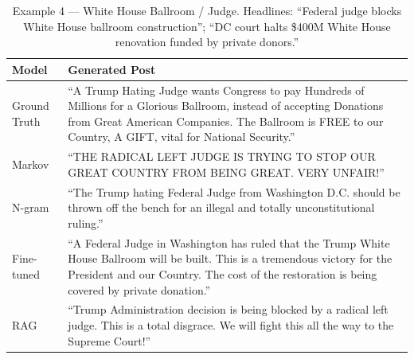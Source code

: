 \documentclass[11pt,a4paper]{article}
\begin{document}
\begin{table}[H]
\centering
\caption{Example 4 --- White House Ballroom / Judge. Headlines: ``Federal judge blocks White House ballroom construction''; ``DC court halts \$400M White House renovation funded by private donors.''}
\label{tab:qual4}
\begin{tabular}{lp{9.5cm}}
\toprule
\textbf{Model} & \textbf{Generated Post} \\
\midrule
Ground Truth  & ``A Trump Hating Judge wants Congress to pay Hundreds of Millions for a Glorious Ballroom, instead of accepting Donations from Great American Companies. The Ballroom is FREE to our Country, A GIFT, vital for National Security.'' \\
\midrule
Markov        & ``THE RADICAL LEFT JUDGE IS TRYING TO STOP OUR GREAT COUNTRY FROM BEING GREAT. VERY UNFAIR!'' \\
N-gram        & ``The Trump hating Federal Judge from Washington D.C. should be thrown off the bench for an illegal and totally unconstitutional ruling.'' \\
Fine-tuned    & ``A Federal Judge in Washington has ruled that the Trump White House Ballroom will be built. This is a tremendous victory for the President and our Country. The cost of the restoration is being covered by private donation.'' \\
RAG           & ``Trump Administration decision is being blocked by a radical left judge. This is a total disgrace. We will fight this all the way to the Supreme Court!'' \\
\bottomrule
\end{tabular}
\end{table}
\end{document}
